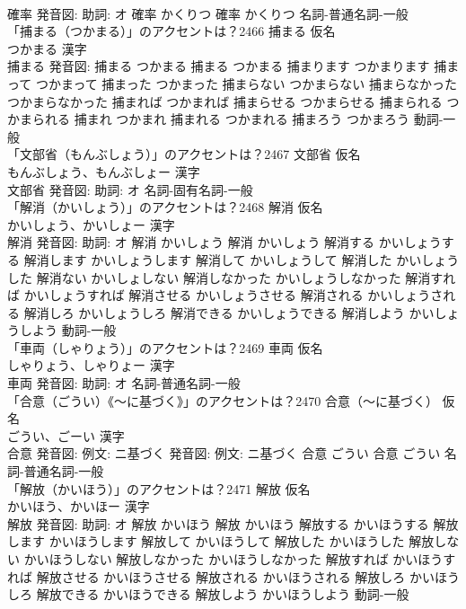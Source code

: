 \documentclass[8pt]{extreport}
\begin{document}
\begin{CJK}{UTF8}{min}
\\	確率 発音図: 助詞: オ	確率 かくりつ		確率 かくりつ				名詞-普通名詞-一般 
\\	「捕まる（つかまる）」のアクセントは？2466	捕まる 仮名　
\\	つかまる 漢字　
\\	捕まる 発音図:	捕まる つかまる		捕まる つかまる 捕まります つかまります 捕まって つかまって 捕まった つかまった 捕まらない つかまらない 捕まらなかった つかまらなかった 捕まれば つかまれば 捕まらせる つかまらせる 捕まられる つかまられる 捕まれ つかまれ 捕まれる つかまれる 捕まろう つかまろう				動詞-一般 
\\	「文部省（もんぶしょう）」のアクセントは？2467	文部省 仮名　
\\	もんぶしょう、もんぶしょー 漢字　
\\	文部省 発音図: 助詞: オ							名詞-固有名詞-一般 
\\	「解消（かいしょう）」のアクセントは？2468	解消 仮名　
\\	かいしょう、かいしょー 漢字　
\\	解消 発音図: 助詞: オ	解消 かいしょう		解消 かいしょう 解消する かいしょうする 解消します かいしょうします 解消して かいしょうして 解消した かいしょうした 解消ない かいしょしない 解消しなかった かいしょうしなかった 解消すれば かいしょうすれば 解消させる かいしょうさせる 解消される かいしょうされる 解消しろ かいしょうしろ 解消できる かいしょうできる 解消しよう かいしょうしよう				動詞-一般 
\\	「車両（しゃりょう）」のアクセントは？2469	車両 仮名　
\\	しゃりょう、しゃりょー 漢字　
\\	車両 発音図: 助詞: オ							名詞-普通名詞-一般 
\\	「合意（ごうい）《〜に基づく》」のアクセントは？2470	合意（〜に基づく） 仮名　
\\	ごうい、ごーい 漢字　
\\	合意 発音図: 例文: ニ基づく 発音図: 例文: ニ基づく	合意 ごうい		合意 ごうい				名詞-普通名詞-一般 
\\	「解放（かいほう）」のアクセントは？2471	解放 仮名　
\\	かいほう、かいほー 漢字　
\\	解放 発音図: 助詞: オ	解放 かいほう		解放 かいほう 解放する かいほうする 解放します かいほうします 解放して かいほうして 解放した かいほうした 解放しない かいほうしない 解放しなかった かいほうしなかった 解放すれば かいほうすれば 解放させる かいほうさせる 解放される かいほうされる 解放しろ かいほうしろ 解放できる かいほうできる 解放しよう かいほうしよう				動詞-一般 

\end{CJK}
\end{document}
